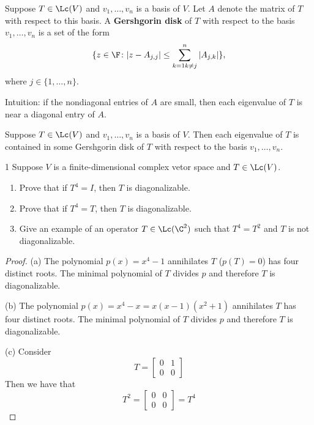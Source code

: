 \documentclass{extarticle}
\begin{document}
\begin{definition}
    Suppose \(T \in \Lc(V)\) and \(v_1, \ldots, v_n\) is a basis of \(V\). Let \(A\) denote the matrix 
    of \(T\) with respect to this basis. A \textbf{Gershgorin disk} of \(T\) with respect to the basis 
    \(v_1, \ldots, v_n\) is a set of the form 
    \[\{z \in \F \colon |z - A_{j,j}| \leq \sum_{k=1 k \neq j}^{n} |A_{j,k}| \},\]
    where \(j \in \{1, \ldots, n\}.\)
\end{definition}

\begin{remark}
    Intuition: if the nondiagonal entries of \(A\) are small, then each eigenvalue of \(T\) is near 
    a diagonal entry of \(A\).
\end{remark}

\begin{thm}
    Suppose \(T \in \Lc(V)\) and \(v_1, \ldots, v_n\) is a basis of \(V\). Then each eigenvalue of \(T\)
    is contained in some Gershgorin disk of \(T\) with respect to the basis \(v_1, \ldots, v_n\).
\end{thm}


\newpage 
{}

\begin{problem}{1}
    Suppose \(V\) is a finite-dimensional complex vetor space and \(T \in \Lc(V)\). 
    \begin{enumerate}[label=(\alph*)]
        \item Prove that if \(T^4 = I\), then \(T\) is diagonalizable. 
        \item Prove that if \(T^4 = T\), then \(T\) is diagonalizable. 
        \item Give an example of an operator \(T \in \Lc(\C^2)\) such that \(T^4 = T^2\) and \(T\) is not 
        diagonalizable.
    \end{enumerate} 
\end{problem}

\begin{proof}
(a) The polynomial \(p(x) = x^4 - 1\) annihilates \(T\) (\(p(T) = 0\)) has four distinct roots. The minimal 
polynomial of \(T\) divides \(p\) and therefore \(T\) is diagonalizable. 

(b) The polynomial \(p(x) = x^4 - x = x(x-1)(x^2 +1)\) annihilates \(T\) has four distinct roots. The minimal 
polynomial of \(T\) divides \(p\) and therefore \(T\) is diagonalizable. 

(c) Consider 
\[T = \begin{bmatrix}
    0 & 1 \\ 
    0 & 0
\end{bmatrix}\]
Then we have that 
\[T^2 = \begin{bmatrix}
    0 & 0 \\ 
    0 & 0
\end{bmatrix} =  T^4 \]
\end{proof}
\end{document}
